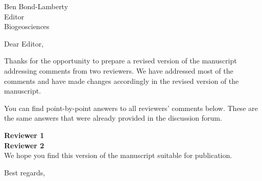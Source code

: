 \documentclass[11pt]{bgcletter}
\begin{document}
\begin{letter}{Ben Bond-Lamberty \\Editor \\
   Biogeosciences 
   }
\opening{Dear Editor,}
Thanks for the opportunity to prepare a revised version of the manuscript addressing comments from two reviewers. We have addressed most of the comments and have made changes accordingly in the revised version of the manuscript. 

You can find point-by-point answers to all reviewers' comments below. These are the same answers that were already provided in the discussion forum. 

\vspace{1cm}
\textbf{Reviewer 1} \\


\vspace{1cm}
\textbf{Reviewer 2} \\


\vspace{1cm}
We hope you find this version of the manuscript suitable for publication.

 \closing{Best regards,}
 \end{letter}

 
\end{document}
